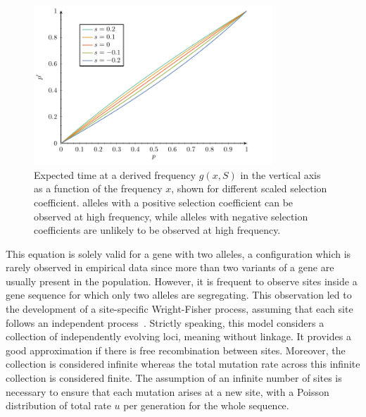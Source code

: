 \begin{figure}[H]
    \centering
    \includegraphics[width=0.8\textwidth, page=4] {figures.pdf}
    \caption[Expected time at a derived frequency]{
    Expected time at a derived frequency $g(x, S)$ in the vertical axis as a function of the frequency $x$, shown for different scaled selection coefficient.
    \Glspl{allele} with a positive selection coefficient can be observed at high frequency, while \glspl{allele} with negative selection coefficients are unlikely to be observed at high frequency.}
    \label{fig:expected-time-at-f}
\end{figure}

This equation is solely valid for a gene with two \glspl{allele}, a configuration which is rarely observed in empirical data since more than two variants of a gene are usually present in the population.
However, it is frequent to observe sites inside a gene sequence for which only two \glspl{allele} are segregating.
This observation led to the development of a site-specific Wright-Fisher process, assuming that each site follows an independent process~\citep{Sawyer1992}.
Strictly speaking, this model considers a collection of independently evolving loci, meaning without linkage.
It provides a good approximation if there is free \gls{recombination} between sites.
Moreover, the collection is considered infinite whereas the total mutation rate across this infinite collection is considered finite.
The assumption of an infinite number of sites is necessary to ensure that each mutation arises at a new site, with a Poisson distribution of total rate $u$ per generation for the whole sequence.

